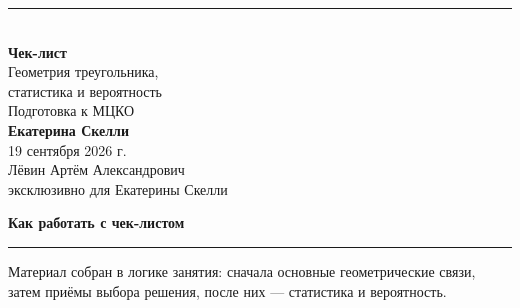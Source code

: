 \documentclass[a4paper,12pt]{article}
\newcommand{\Section}[1]{%
  \Needspace{5\baselineskip}%
  \vspace{0.6em}%
  {\Large\bfseries\color{darkaccent}#1}\par
  \vspace{0.2em}%
  {\color{accent}\rule{0.14\linewidth}{1.2pt}}\par
  \vspace{0.4em}%
}
\renewcommand{\today}{19 сентября 2026 г.}
\begin{document}
\thispagestyle{empty}

\begin{center}
  \vspace*{25mm}

  {\color{accent}\rule{0.18\textwidth}{1.3pt}}\\[12mm]

  {\fontsize{28}{34}\selectfont
   \bfseries\color{darkaccent}Чек-лист}\\[7mm]

  {\fontsize{19}{24}\selectfont
   Геометрия треугольника,\\
   статистика и вероятность}\\[10mm]

  {\large Подготовка к МЦКО}\\[20mm]

  {\Large\bfseries Екатерина Скелли}\\[22mm]

  {\normalsize \today}\\[6mm]

  {\normalsize Лёвин Артём Александрович}\\[2mm]

  {\normalsize\color{muted}
   эксклюзивно для Екатерины Скелли}

  \vfill


  \vspace*{8mm}
\end{center}

\clearpage

\Section{Как работать с чек-листом}

Материал собран в логике занятия: сначала основные геометрические связи,
затем приёмы выбора решения, после них — статистика и вероятность.
\end{document}
